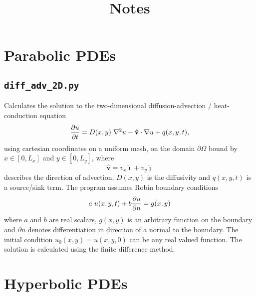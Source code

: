 \documentclass{article}
\begin{document}
\title{Notes}

\section{Parabolic PDEs}

\subsection{\texttt{diff\_adv\_2D.py}} 

Calculates the solution to the two-dimensional diffusion-advection / heat-conduction equation
\begin{equation*}
\frac{\partial u}{\partial t} = D(x,y) \hspace{0.1cm} \nabla^{2} u  - \mathbf{\hat{v}} \cdot \nabla u + q(x,y,t),
\end{equation*}
using cartesian coordinates on a uniform mesh, on the domain $\partial \Omega$ bound by $x \in [0,L_x]$ and $y \in [0,L_y]$, where
\begin{equation*}
\mathbf{\hat{v}} = v_x \mathbf{\hat{\imath}} + v_y \mathbf{\hat{\jmath}}
\end{equation*}
describes the direction of advection, $D(x,y)$ is the diffusivity and $q(x,y,t)$ is a source/sink term. The program assumes Robin boundary conditions
\begin{equation*}
a \hspace{0.1cm} u(x,y,t) + b  \frac{\partial u}{\partial n} = g(x,y)
\end{equation*}
where $a$ and $b$ are real scalars, $g(x,y)$ is an arbitrary function on the boundary and $\partial n$ denotes differentiation in direction of a normal to the boundary. The initial condition $u_0(x,y)=u(x,y,0)$ can be any real valued function. The solution is calculated using the finite difference method.

\section{Hyperbolic PDEs}
\end{document}
